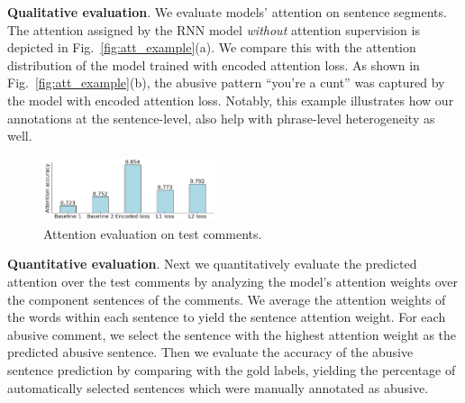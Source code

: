 \documentclass[letterpaper]{article}
\begin{document}
\noindent\textbf{Qualitative evaluation}.
We evaluate models' attention on sentence segments.
The attention assigned by the RNN model \textit{without} attention supervision is depicted in Fig.~\ref{fig:att_example}(a). We compare this with the attention distribution of the model trained with encoded attention loss. As shown in Fig.~\ref{fig:att_example}(b), the abusive pattern ``you're a cunt'' was captured by the model with encoded attention loss. Notably, this example illustrates how  our annotations at the sentence-level, also help with phrase-level heterogeneity as well.
\begin{figure}[htbp!]
\captionsetup{font=normalsize}
\centering
\includegraphics[width=0.45\textwidth]{attn_eval_plot.png}
\caption{Attention evaluation on test comments.}
\label{fig:attn_eval_plot}
\end{figure}

\noindent\textbf{Quantitative evaluation}. Next we quantitatively evaluate the predicted attention over the test comments by analyzing the model's attention weights over the component sentences of the comments. We average the attention weights of the words within each sentence to yield the sentence attention weight. For each abusive comment, we select the sentence with the highest attention weight as the predicted abusive sentence. Then we evaluate the accuracy of the abusive sentence prediction by comparing with the gold labels, yielding the percentage of automatically selected sentences which were manually annotated as abusive.


\begin{table}[htbp!]
\captionsetup{font=normalsize}
\centering
{}
\caption{PR AUC of abuse categorization with and without attention supervision in single- and multi-task settings.}
\label{tab:categorization}
\end{table}
\end{document}
